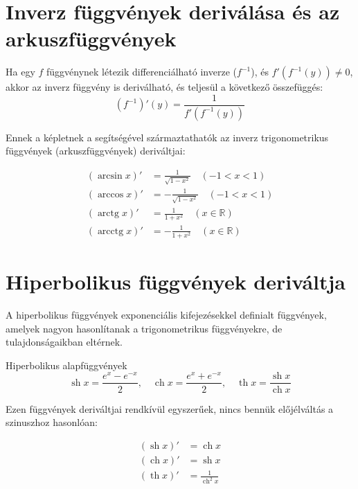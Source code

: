 \documentclass[11pt,a4paper]{article}
\begin{document}
\section{Inverz függvények deriválása és az arkuszfüggvények}
Ha egy $f$ függvénynek létezik differenciálható inverze ($f^{-1}$), és $f'(f^{-1}(y)) \neq 0$, akkor az inverz függvény is deriválható, és teljesül a következő összefüggés:
\[
(f^{-1})'(y) = \frac{1}{f'(f^{-1}(y))}
\]

Ennek a képletnek a segítségével származtathatók az inverz trigonometrikus függvények (arkuszfüggvények) deriváltjai:

\begin{align*}
    (\arcsin x)' &= \frac{1}{\sqrt{1 - x^2}} \quad (-1 < x < 1) \\
    (\arccos x)' &= -\frac{1}{\sqrt{1 - x^2}} \quad (-1 < x < 1) \\
    (\operatorname{arctg} x)' &= \frac{1}{1 + x^2} \quad (x \in \mathbb{R}) \\
    (\operatorname{arcctg} x)' &= -\frac{1}{1 + x^2} \quad (x \in \mathbb{R})
\end{align*}

\section{Hiperbolikus függvények deriváltja}
A hiperbolikus függvények exponenciális kifejezésekkel definialt függvények, amelyek nagyon hasonlítanak a trigonometrikus függvényekre, de tulajdonságaikban eltérnek.

\begin{defbox}{Hiperbolikus alapfüggvények}
\[
\operatorname{sh} x = \frac{e^x - e^{-x}}{2}, \quad \operatorname{ch} x = \frac{e^x + e^{-x}}{2}, \quad \operatorname{th} x = \frac{\operatorname{sh} x}{\operatorname{ch} x}
\]
\end{defbox}

Ezen függvények deriváltjai rendkívül egyszerűek, nincs bennük előjélváltás a szinuszhoz hasonlóan:

\begin{align*}
    (\operatorname{sh} x)' &= \operatorname{ch} x \\
    (\operatorname{ch} x)' &= \operatorname{sh} x \\
    (\operatorname{th} x)' &= \frac{1}{\operatorname{ch}^2 x}
\end{align*}
\end{document}
